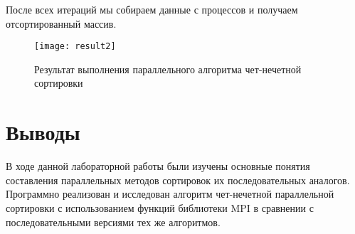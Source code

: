 \documentclass[a4paper,14pt]{extarticle}
\begin{document}
После всех итераций мы собираем данные с процессов и получаем отсортированный
массив.
\begin{figure}[H]
    \centering
    \texttt{[image: result2]}
    \caption{Результат выполнения параллельного алгоритма чет-нечетной сортировки}
    \label{fig:result2}
\end{figure}

\section*{Выводы}
В ходе данной лабораторной работы были изучены основные понятия составления
параллельных методов сортировок их последовательных аналогов. Программно
реализован и исследован алгоритм чет-нечетной параллельной сортировки с
использованием функций библиотеки MPI в сравнении с последовательными версиями
тех же алгоритмов.
\end{document}
